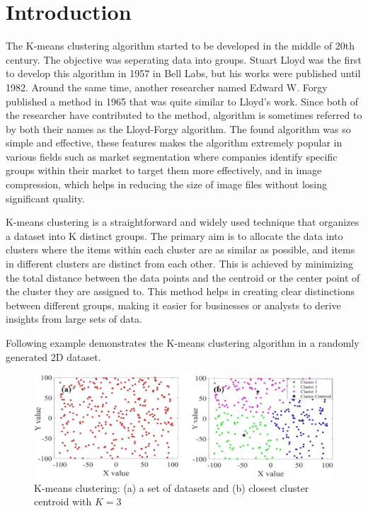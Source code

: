\section{Introduction}
The K-means clustering algorithm started to be developed in the middle of 20th century. The objective was seperating data into groups. Stuart Lloyd was the first to develop this algorithm in 1957 in Bell Labs, but his works were published until 1982. Around the same time, another researcher named Edward W. Forgy published a method in 1965 that was quite similar to Lloyd's work. Since both of the researcher have contributed to the method, algorithm is sometimes referred to by both their names as the Lloyd-Forgy algorithm. The found algorithm was so simple and effective, these features makes the algorithm extremely popular in various fields such as market segmentation where companies identify specific groups within their market to target them more effectively, and in image compression, which helps in reducing the size of image files without losing significant quality.

K-means clustering is a straightforward and widely used technique that organizes a dataset into K distinct groups. The primary aim is to allocate the data into clusters where the items within each cluster are as similar as possible, and items in different clusters are distinct from each other. This is achieved by minimizing the total distance between the data points and the centroid or the center point of the cluster they are assigned to. This method helps in creating clear distinctions between different groups, making it easier for businesses or analysts to derive insights from large sets of data.

\empty

Following example demonstrates the K-means clustering algorithm in a randomly generated 2D dataset. \\

\begin{figure}[H]
    \centering
    \includegraphics[width=\textwidth]{figures/ref.jpg}
    \caption{K-means clustering: (a) a set of datasets and (b) closest cluster centroid with $K = 3$ \cite{MINH2022109189}}
    \label{brich}
\end{figure}

